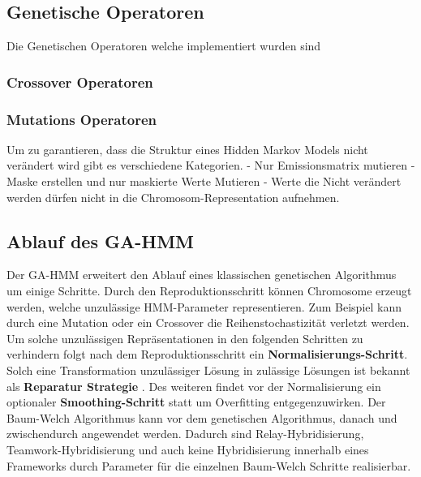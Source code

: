 \subsection*{Genetische Operatoren}
Die Genetischen Operatoren welche implementiert wurden sind

\subsubsection*{Crossover Operatoren}


\subsubsection*{Mutations Operatoren}
Um zu garantieren, dass die Struktur eines Hidden Markov Models nicht verändert wird gibt es verschiedene Kategorien.
- Nur Emissionsmatrix mutieren
- Maske erstellen und nur maskierte Werte Mutieren
- Werte die Nicht verändert werden dürfen nicht in die Chromosom-Representation aufnehmen.

\subsection*{Ablauf des GA-HMM}
Der GA-HMM erweitert den Ablauf eines klassischen genetischen Algorithmus um einige Schritte. Durch den Reproduktionsschritt können Chromosome erzeugt werden, welche unzulässige HMM-Parameter representieren. Zum Beispiel kann durch eine Mutation oder ein Crossover die Reihenstochastizität verletzt werden. Um solche unzulässigen Repräsentationen in den folgenden Schritten zu verhindern folgt nach dem Reproduktionsschritt ein \textbf{Normalisierungs-Schritt}. Solch eine Transformation unzulässiger Lösung in zulässige Lösungen ist bekannt als \textbf{Reparatur Strategie} \cite*{MetaheuristicsEGT}. Des weiteren findet vor der Normalisierung ein optionaler \textbf{Smoothing-Schritt} statt um Overfitting entgegenzuwirken. Der Baum-Welch Algorithmus kann vor dem genetischen Algorithmus, danach und zwischendurch angewendet werden. Dadurch sind Relay-Hybridisierung, Teamwork-Hybridisierung und auch keine Hybridisierung innerhalb eines Frameworks durch Parameter für die einzelnen Baum-Welch Schritte realisierbar.

